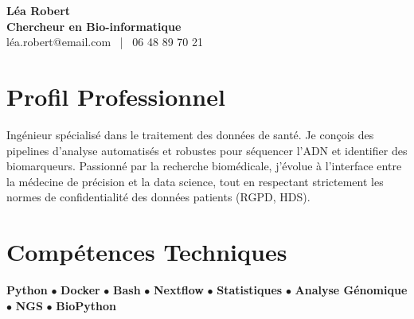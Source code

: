 \documentclass[11pt,a4paper]{article}
\begin{document}
\begin{center}
    {\Huge \textbf{Léa Robert}} \\[0.2cm]
    {\Large \textbf{Chercheur en Bio-informatique}} \\[0.1cm]
    léa.robert@email.com \ | \ 06 48 89 70 21
\end{center}

\vspace{0.3cm}

\section*{Profil Professionnel}
\noindent
Ingénieur spécialisé dans le traitement des données de santé. Je conçois des pipelines d'analyse automatisés et robustes pour séquencer l'ADN et identifier des biomarqueurs. Passionné par la recherche biomédicale, j'évolue à l'interface entre la médecine de précision et la data science, tout en respectant strictement les normes de confidentialité des données patients (RGPD, HDS).

\vspace{0.3cm}

\section*{Compétences Techniques}
\noindent
\textbf{Python} $\bullet$ \textbf{Docker} $\bullet$ \textbf{Bash} $\bullet$ \textbf{Nextflow} $\bullet$ \textbf{Statistiques} $\bullet$ \textbf{Analyse Génomique} $\bullet$ \textbf{NGS} $\bullet$ \textbf{BioPython}

\vspace{0.3cm}

\end{document}
